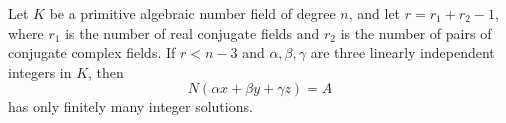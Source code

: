\begin{proposition}
    Let $K$ be a primitive algebraic number field of degree $n$, and let $r=r_1+r_2-1$, where $r_1$ is the number of real conjugate fields and $r_2$ is the number of pairs of conjugate complex fields. If $r<n-3$ and $\alpha,\beta,\gamma$ are three linearly independent integers in $K$, then
\[
    N(\alpha x+\beta y+\gamma z)=A
\]
    has only finitely many integer solutions.
\end{proposition}
